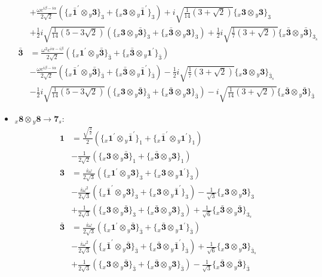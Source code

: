 \documentclass[english]{article}
\newcommand{\rep}[1]{\mathbf{#1}}
\newcommand{\repx}[2]{{}_{#2}\mathbf{#1}}
\newcommand{\subcg}[3]{\big\{ \repx{#1}{x}\otimes\repx{#2}{y}\big\}^{}_{#3}}
\begin{document}
\begin{itemize}
\begin{align*}
 & +\frac{\omega  e^{i \beta -i \alpha }}{2 \sqrt{2}}\left(\subcg{\bar{1}^{\prime}}{3}{3}+\subcg{3}{\bar{1}^{\prime}}{3}\right)+i \sqrt{\frac{1}{14} \left(3+\sqrt{2}\right)}\subcg{3}{3}{3} \\ 
 & +\frac{1}{2} i \sqrt{\frac{1}{14} \left(5-3 \sqrt{2}\right)}\left(\subcg{3}{\bar{3}}{3}+\subcg{\bar{3}}{3}{3}\right)+\frac{1}{2} i \sqrt{\frac{1}{7} \left(3+\sqrt{2}\right)}\subcg{\bar{3}}{\bar{3}}{3_{s}}
\\
\rep{\bar{3}} & = \frac{\omega ^2 e^{i \alpha -i \beta }}{2 \sqrt{2}}\left(\subcg{1^{\prime}}{\bar{3}}{\bar{3}}+\subcg{\bar{3}}{1^{\prime}}{\bar{3}}\right) \\ 
 & -\frac{\omega  e^{i \beta -i \alpha }}{2 \sqrt{2}}\left(\subcg{\bar{1}^{\prime}}{\bar{3}}{\bar{3}}+\subcg{\bar{3}}{\bar{1}^{\prime}}{\bar{3}}\right)-\frac{1}{2} i \sqrt{\frac{1}{7} \left(3+\sqrt{2}\right)}\subcg{3}{3}{\bar{3}_{s}} \\ 
 & -\frac{1}{2} i \sqrt{\frac{1}{14} \left(5-3 \sqrt{2}\right)}\left(\subcg{3}{\bar{3}}{\bar{3}}+\subcg{\bar{3}}{3}{\bar{3}}\right)-i \sqrt{\frac{1}{14} \left(3+\sqrt{2}\right)}\subcg{\bar{3}}{\bar{3}}{\bar{3}}
\end{align*}
\item $\repx{8}{x}\otimes\repx{8}{y}\to\rep{7}_{s}$:
\begin{align*}
\rep{1} & = \frac{\sqrt{\frac{3}{2}}}{2}\left(\subcg{1^{\prime}}{\bar{1}^{\prime}}{1}+\subcg{\bar{1}^{\prime}}{1^{\prime}}{1}\right) \\ 
 & -\frac{1}{2 \sqrt{2}}\left(\subcg{3}{\bar{3}}{1}+\subcg{\bar{3}}{3}{1}\right)
\\
\rep{3} & = \frac{i \omega }{2 \sqrt{3}}\left(\subcg{1^{\prime}}{3}{3}+\subcg{3}{1^{\prime}}{3}\right) \\ 
 & -\frac{i \omega ^2}{2 \sqrt{3}}\left(\subcg{\bar{1}^{\prime}}{3}{3}+\subcg{3}{\bar{1}^{\prime}}{3}\right)-\frac{1}{\sqrt{3}}\subcg{3}{3}{3} \\ 
 & +\frac{1}{2 \sqrt{3}}\left(\subcg{3}{\bar{3}}{3}+\subcg{\bar{3}}{3}{3}\right)+\frac{1}{\sqrt{6}}\subcg{\bar{3}}{\bar{3}}{3_{s}}
\\
\rep{\bar{3}} & = \frac{i \omega }{2 \sqrt{3}}\left(\subcg{1^{\prime}}{\bar{3}}{\bar{3}}+\subcg{\bar{3}}{1^{\prime}}{\bar{3}}\right) \\ 
 & -\frac{i \omega ^2}{2 \sqrt{3}}\left(\subcg{\bar{1}^{\prime}}{\bar{3}}{\bar{3}}+\subcg{\bar{3}}{\bar{1}^{\prime}}{\bar{3}}\right)+\frac{1}{\sqrt{6}}\subcg{3}{3}{\bar{3}_{s}} \\ 
 & +\frac{1}{2 \sqrt{3}}\left(\subcg{3}{\bar{3}}{\bar{3}}+\subcg{\bar{3}}{3}{\bar{3}}\right)-\frac{1}{\sqrt{3}}\subcg{\bar{3}}{\bar{3}}{\bar{3}}

\end{align*}
\end{itemize}
\end{document}

